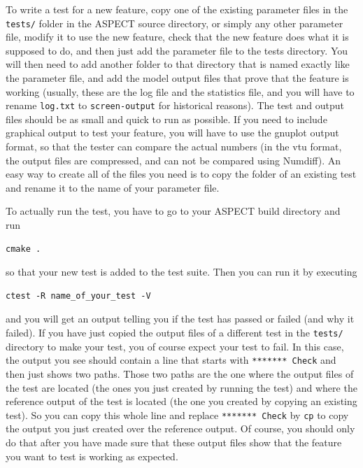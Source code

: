 \documentclass{article}
\newcommand{\aspect}{\textsc{ASPECT}}
\begin{document}
To write a test for a new feature, copy one of the existing parameter files in
the \texttt{tests/} folder in the \aspect{} source directory, or simply any other 
parameter file, modify it to use the new feature, check that the
new feature does what it is supposed to do, and then just add the parameter file to
the tests directory. You will then need to add another folder to that directory
that is named exactly like the parameter file, and add the model output files that
prove that the feature is working (usually, these are the log file and the statistics 
file, and you will have to rename \texttt{log.txt} to
\texttt{screen-output} for historical reasons). The test and output files should
be as small and quick to run as possible. If you need to include graphical output to 
test your feature, you will have to use the gnuplot output format, so that the tester 
can compare the actual numbers (in the vtu format, the output files are compressed, 
and can not be compared using Numdiff). 
An easy way to create all of the files you need is to copy the folder of an existing 
test and rename it to the name of your parameter file. 

To actually run the test, you have to go to your \aspect{} build directory and run 
\begin{lstlisting}[frame=single,language=ksh] 
    cmake .
\end{lstlisting}
so that your new test is added to the test suite. Then you can run it by executing 
\begin{lstlisting}[frame=single,language=ksh] 
    ctest -R name_of_your_test -V
\end{lstlisting}
and you will get an output telling you if the test has 
passed or failed (and why it failed). If you have just copied the output files of a different 
test in the \texttt{tests/} directory to make your test, you of course expect your test to fail. 
In this case, the output you see should contain a line that starts with \texttt{******* Check} 
and then just shows two paths. Those two paths are the one where the output files of the test 
are located (the ones you just created by running the test) and where the reference output of the 
test is located (the one you created by copying an existing test). So you can copy this whole line
and replace \texttt{******* Check} by \texttt{cp} to copy the output you just created over the 
reference output. Of course, you should only do that after you have made sure that these output 
files show that the feature you want to test is working as expected. 
\end{document}
